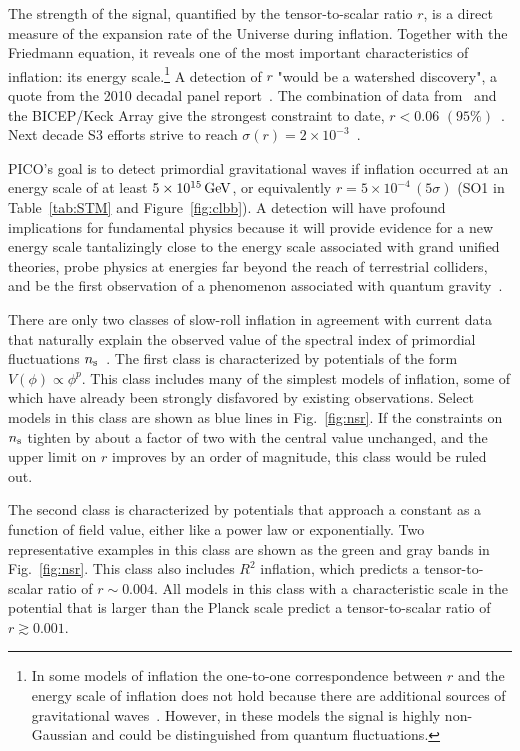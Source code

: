 \documentclass[PICOReport.tex]{subfiles}
\begin{document}
The strength of the signal, quantified by the tensor-to-scalar ratio $r$, is a direct measure of the expansion rate of the Universe during inflation. Together with the Friedmann equation, it reveals one of the most important characteristics of inflation: its energy scale.\footnote{In some models of inflation the one-to-one correspondence between $r$ and the energy scale of inflation does not hold because there are additional sources of gravitational waves~\cite{Namba:2015gja}. However, in these models the signal is highly non-Gaussian and could be distinguished from quantum fluctuations.}  A detection of $r$  "would be a watershed discovery", a quote from the 2010 decadal panel report~\citep{blandford2010}. The combination of data from \planck\ and the BICEP/Keck Array give the strongest constraint to date, $r<0.06\,\, (95\%)$~\citep{2018arXiv181005216A}. Next decade S3 efforts strive to reach $\sigma(r)=2 \times10^{-3}$~\citep{SOscience, biceparray}.

PICO's goal is to detect primordial gravitational waves if inflation occurred at an energy scale of at least $5\times 10^{15}\,\rm{GeV}$, or equivalently $r= 5\times 10^{-4} \, (5\sigma)$ (SO1 in Table~\ref{tab:STM} and Figure~\ref{fig:clbb}). 
A detection will have profound implications for fundamental physics because it will provide evidence for a new energy scale tantalizingly close to the energy scale associated with grand unified theories, probe physics at energies far beyond the reach of terrestrial colliders, and be the first observation of a phenomenon associated with quantum gravity~\cite{Krauss:2013pha}.

There are only two classes of slow-roll inflation in agreement with current data that naturally explain the observed value of the spectral index of primordial fluctuations $n_{\rm s}$~\cite{Aghanim:2018eyx}. The first class is characterized by potentials of the form $V(\phi)\propto\phi^p$. This class includes many of the simplest models of inflation, some of which have already been strongly disfavored by existing observations. Select models in this class are shown as blue lines in Fig.~\ref{fig:nsr}. If the constraints on $n_{\rm s}$ tighten by about a factor of two with the central value unchanged, and the upper limit on $r$ improves by an order of magnitude, this class would be ruled out. 

The second class is characterized by potentials that approach a constant as a function of field value, either like a power law or exponentially. Two representative examples in this class are shown as the green and gray bands in Fig.~\ref{fig:nsr}. This class also includes $R^2$ inflation, which predicts a tensor-to-scalar ratio of $r\sim 0.004$. All models in this class with a characteristic scale in the potential that is larger than the Planck scale predict a tensor-to-scalar ratio of $r\gtrsim 0.001$. 
\end{document}
